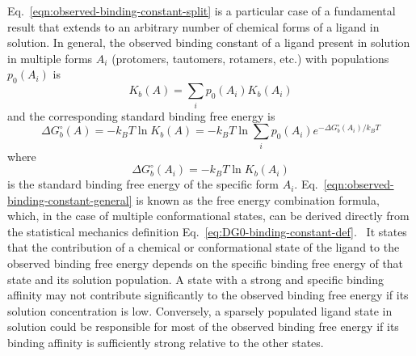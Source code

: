 \documentclass[9pt,bestpractices]{livecoms}
\begin{document}
Eq.~\ref{eqn:observed-binding-constant-split} is a particular case of a fundamental result that extends to an arbitrary number of chemical forms of a ligand in solution. In general, the observed binding constant of a ligand present in solution in multiple forms $A_i$ (protomers, tautomers, rotamers, etc.) with populations $p_0(A_i)$ is~\cite{khuttan2023taming}
\begin{equation}
  K_b(A) = \sum_i p_0(A_i) K_b(A_i)
  \label{eqn:observed-binding-constant-general}
\end{equation}
and the corresponding standard binding free energy is
\begin{equation}
 \Delta G^\circ_b(A) = -k_B T \ln K_b(A) = -k_B T \ln \sum_i p_0(A_i) e^{-\Delta G^\circ_b(A_i)/k_B T}
  \label{eqn:observed-binding-free-energy-general}
\end{equation}
where
\begin{equation}
\Delta G^\circ_b(A_i) = -k_B T \ln K_b(A_i)
\end{equation}
is the standard binding free energy of the specific form $A_i$. Eq.~\ref{eqn:observed-binding-constant-general} is known as the free energy combination formula, which, in the case of multiple conformational states, can be derived directly from the statistical mechanics definition Eq.~\ref{eq:DG0-binding-constant-def}.~\cite{jayachandran2006parallelized,gallicchio2011recent} It states that the contribution of a chemical or conformational state of the ligand to the observed binding free energy depends on the specific binding free energy of that state and its solution population. A state with a strong and specific binding affinity may not contribute significantly to the observed binding free energy if its solution concentration is low. Conversely, a sparsely populated ligand state in solution could be responsible for most of the observed binding free energy if its binding affinity is sufficiently strong relative to the other states.~\cite{azimi2022application}   
\end{document}
